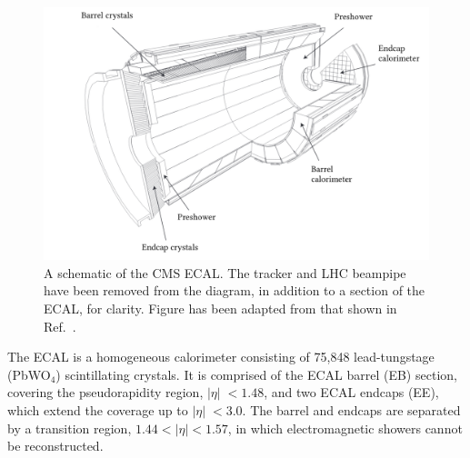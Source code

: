 \begin{figure}[t]
  \centering
  \includegraphics[width=1\textwidth]{Figures/cms/ecal.pdf}
  \caption[The CMS electromagnetic calorimeter]
  {
    A schematic of the CMS ECAL. The tracker and LHC beampipe have been removed from the diagram, in addition to a section of the ECAL, for clarity. Figure has been adapted from that shown in Ref.~\cite{Chatrchyan:2008zzk}.
  }
  \label{fig:cms_ecal}
\end{figure}

The ECAL is a homogeneous calorimeter consisting of 75,848 lead-tungstage (PbWO$_4$) scintillating crystals. It is comprised of the ECAL barrel (EB) section, covering the pseudorapidity region, $|\eta|\;<1.48$, and two ECAL endcaps (EE), which extend the coverage up to $|\eta|\;<3.0$. The barrel and endcaps are separated by a transition region, ${1.44<|\eta|<1.57}$, in which electromagnetic showers cannot be reconstructed. 

